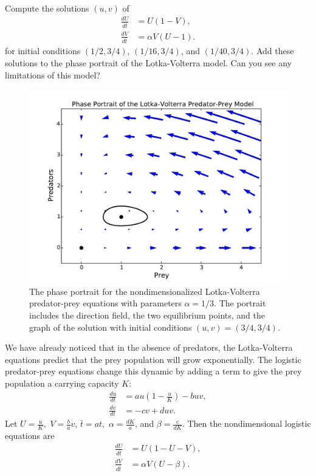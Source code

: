 \begin{problem}
	Compute the solutions $(u,v)$ of 
	\begin{align*}
		\frac{dU}{d\bar{t}} &= U(1-V),\\
		\frac{dV}{d\bar{t}} &= \alpha V (U-1).
	\end{align*}
	for initial conditions $(1/2, 3/4)$, $(1/16, 3/4)$, and $(1/40, 3/4)$.
	Add these solutions to the phase portrait of the Lotka-Volterra model.
	Can you see any limitations of this model? 
\end{problem}

\begin{figure}[ht]
\centering
\includegraphics[width=\textwidth]{Lotka_Volterra_Phase_Portrait.pdf}
\caption{The phase portrait for the nondimensionalized Lotka-Volterra 
predator-prey equations with parameters $\alpha = 1/3$. 
The portrait includes the direction field, the two equilibrium points, 
and the graph of the solution with initial conditions $(u,v) = (3/4, 3/4)$. }
\label{pred-prey:Lotka_Voterra_Phase_Portrait}
\end{figure}

We have already noticed that in the absence of predators, the Lotka-Volterra 
equations predict that the prey population will grow exponentially. The logistic 
predator-prey equations change this dynamic by adding a term to give the prey 
population a carrying capacity $K$: 
\begin{align*}
	\frac{du}{dt} &= au\left(1 -\frac{u}{K}\right) - buv,\\
	\frac{dv}{dt} &= -cv + duv.
\end{align*}
Let $U = \frac{u}{K},$ $V = \frac{b}{a}v$, $\bar{t} = at,$  
$\alpha = \frac{dK}{a}$, and $\beta = \frac{c}{dK}$. Then the nondimensional logistic
equations are 
\begin{align*}
	\frac{dU}{d\bar{t}} &= U(1-U-V),\\
	\frac{dV}{d\bar{t}} &= \alpha V (U-\beta).
\end{align*}

